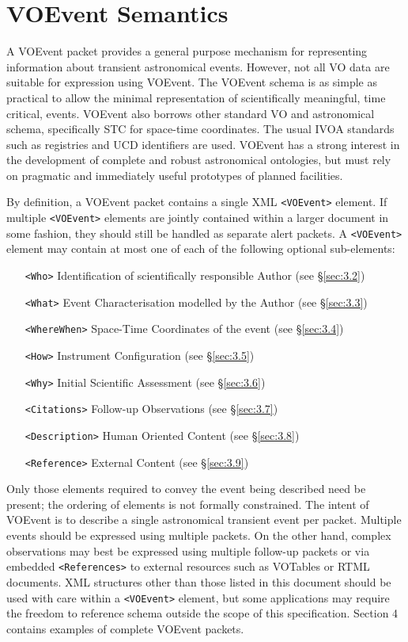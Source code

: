 \documentclass[11pt,a4paper]{ivoa}
\begin{document}
\section{VOEvent Semantics}
\label{sec:3}
A VOEvent packet provides a general purpose mechanism for representing 
information about transient astronomical events. However, not all VO data are 
suitable for expression using VOEvent. The VOEvent schema 
\citep{2011ivoa.spec.0711S} is as simple as practical to allow the minimal 
representation of scientifically meaningful, time critical, events. VOEvent 
also borrows other standard VO and astronomical schema, specifically STC for 
space-time coordinates. The usual IVOA standards such as registries and UCD 
identifiers are used. VOEvent has a strong interest in the development of 
complete and robust astronomical ontologies, but must rely on pragmatic and 
immediately useful prototypes of planned facilities. 

By definition, a VOEvent packet contains a single XML {\tt <VOEvent>} element. 
If multiple {\tt <VOEvent>} elements are jointly contained within a larger 
document in some fashion, they should still be handled as separate alert 
packets. A {\tt <VOEvent>} element may contain at most one of each of the 
following optional sub-elements:
\begin{itemize}
\item[\tt <Who>] Identification of scientifically responsible Author (see 
\S\ref{sec:3.2})
\item[\tt <What>] Event Characterisation modelled by the Author (see 
\S\ref{sec:3.3})
\item[\tt <WhereWhen>] Space-Time Coordinates of the event (see \S\ref{sec:3.4})
\item[\tt <How>] Instrument Configuration (see \S\ref{sec:3.5})
\item[\tt <Why>] Initial Scientific Assessment (see \S\ref{sec:3.6})
\item[\tt <Citations>] Follow-up Observations (see \S\ref{sec:3.7})
\item[\tt <Description>] Human Oriented Content (see \S\ref{sec:3.8})
\item[\tt <Reference>] External Content (see \S\ref{sec:3.9})
\end{itemize}

Only those elements required to convey the event being described need be 
present; the ordering of elements is not formally constrained. The intent of 
VOEvent is to describe a single astronomical transient event per packet. 
Multiple events should be expressed using multiple packets. On the other hand, 
complex observations may best be expressed using multiple follow-up packets or 
via embedded {\tt <References>} to external resources such as VOTables or RTML 
documents. XML structures other than those listed in this document should be 
used with care within a {\tt <VOEvent>} element, but some applications may 
require the freedom to reference schema outside the scope of this specification. 
Section 4 contains examples of complete VOEvent packets. 
\end{document}
